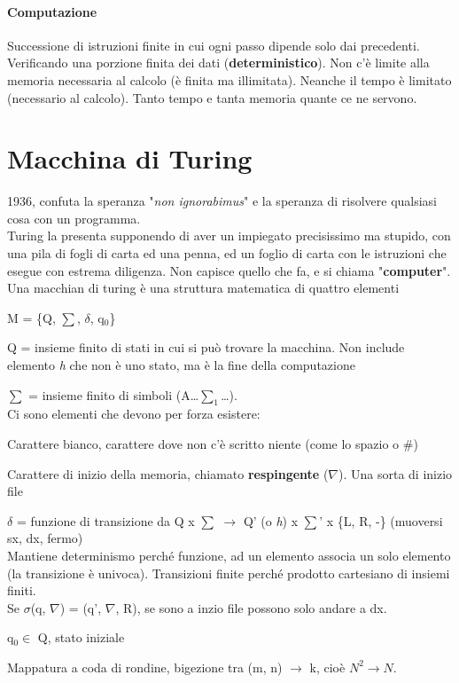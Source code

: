 \documentclass[10pt]{article}
\begin{document}
\paragraph{Computazione} Successione di istruzioni finite in cui ogni passo dipende solo dai precedenti. Verificando una porzione finita dei dati (\textbf{deterministico}). Non c'è limite alla memoria necessaria al calcolo (è finita ma illimitata). Neanche il tempo è limitato (necessario al calcolo). Tanto tempo e tanta memoria quante ce ne servono.

\section{Macchina di Turing}
1936, confuta la speranza "\textit{non ignorabimus}" e la speranza di risolvere qualsiasi cosa con un programma.\\
Turing la presenta supponendo di aver un impiegato precisissimo ma stupido, con una pila di fogli di carta ed una penna, ed un foglio di carta con le istruzioni che esegue con estrema diligenza. Non capisce quello che fa, e si chiama "\textbf{computer}".
Una macchian di turing è una struttura matematica di quattro elementi
\begin{center}
M = \{Q, $\sum$, $\delta$, q$_0$\}
\end{center}
\begin{list}{}{}
	\item Q = insieme finito di stati in cui si può trovare la macchina. Non include elemento \textit{h} che non è uno stato, ma è la fine della computazione
	\item $\sum$ = insieme finito di simboli (A\ldots $\sum_1$\ldots).\\
	Ci sono elementi che devono per forza esistere:
	\begin{list}{}{}
		\item Carattere bianco, carattere dove non c'è scritto niente (come lo spazio o \#)
		\item Carattere di inizio della memoria, chiamato \textbf{respingente} ($\nabla$). Una sorta di inizio file
	\end{list}
	\item $\delta$ = funzione di transizione da Q x $\sum$ $\rightarrow$ Q' (o \textit{h}) x $\sum$' x \{L, R, -\} (muoversi sx, dx, fermo)\\
	Mantiene determinismo perché funzione, ad un elemento associa un solo elemento (la transizione è univoca). Transizioni finite perché prodotto cartesiano di insiemi finiti.\\
Se $\sigma$(q, $\nabla$) = (q', $\nabla$, R), se sono a inzio file possono solo andare a dx.
	\item q$_0 \in $ Q, stato iniziale 
\end{list}
Mappatura a coda di rondine, bigezione tra (m, n) $\rightarrow$ k, cioè $N^2 \rightarrow N$.
\end{document}
